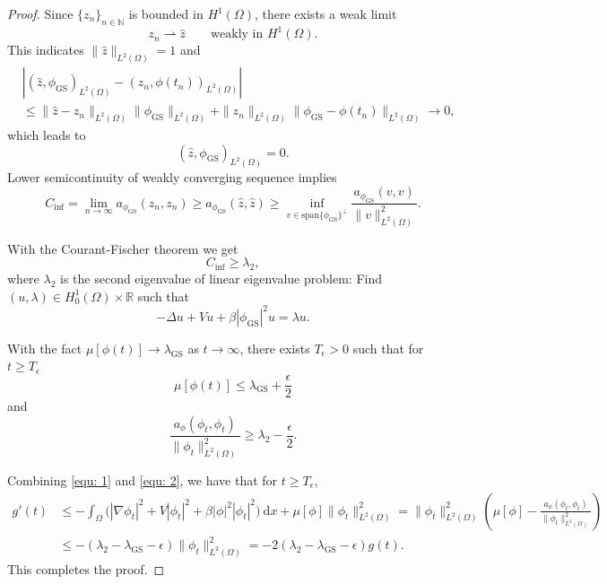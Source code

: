 \documentclass[10pt,a4paper]{amsart}
\def\R{\mathbb{R}}
\begin{document}
\begin{proof}
Since $\{z_n\}_{n \in \mathbb{N}}$ is bounded in $H^1(\Omega)$, there exists a weak limit 
\begin{equation*}
	z_n \rightharpoonup \hat{z} \qquad \text{weakly in $H^1(\Omega)$}.
\end{equation*}
This indicates $\|\hat{z}\|_{L^2(\Omega)} = 1$ and
\begin{align*}
	&\left| (\hat{z}, \phi_{\text{GS}})_{L^2(\Omega)} - (z_n, \phi(t_n))_{L^2(\Omega)}  \right| \\
	 &\le \|\hat{z} - z_n\|_{L^2(\Omega)}\|\phi_{\text{GS}}\|_{L^2(\Omega)} + \|z_n\|_{L^2(\Omega)}\|\phi_{\text{GS}} - \phi(t_n)\|_{L^2(\Omega)}  \to 0,
\end{align*} 
which leads to
\begin{equation*}
	(\hat{z}, \phi_{\text{GS}})_{L^2(\Omega)} = 0.
\end{equation*}
Lower semicontinuity of weakly converging sequence implies 
\begin{equation*}
	C_{\text{inf}} = \lim_{n \to \infty}a_{\phi_{\text{GS}}}(z_n,z_n) \ge a_{\phi_{\text{GS}}}(\hat{z}, \hat{z}) \ge \inf_{v \in \text{span}\{\phi_{\text{GS}}\}^\bot} \frac{a_{\phi_{\text{GS}}}(v, v)}{\|v\|_{L^2(\Omega)}^2}.
\end{equation*}

With the Courant-Fischer theorem we get
\begin{equation*}
	C_{\text{inf}} \ge \lambda_2,
\end{equation*}
where $\lambda_2$ is the second eigenvalue of linear eigenvalue problem: Find $(u,\lambda) \in H_0^1(\Omega) \times \R$ such that
\begin{equation*}
	- \Delta u + V u + \beta |\phi_{\text{GS}}|^2 u = \lambda u.
\end{equation*}
	
With the fact $\mu[\phi(t)] \to \lambda_{\text{GS}}$ as $t \to \infty$, there exists $T_{\epsilon} > 0$ such that for $t \ge T_{\epsilon}$
\begin{equation}\label{equ: 1}
	\mu[\phi(t)] \le \lambda_{\text{GS}} + \frac{\epsilon}{2}
\end{equation}
and 
\begin{equation}\label{equ: 2}
	\frac{a_{\phi}(\phi_t,\phi_t)}{\|\phi_t\|_{L^2(\Omega)}^2} \ge \lambda_2 - \frac{\epsilon}{2}.
\end{equation}

Combining \eqref{equ: 1} and \eqref{equ: 2}, we have that for $t \ge T_{\epsilon}$, 
\begin{align*}
	g'(t) & \le - \int_{\Omega} \Big( |\nabla \phi_t|^2 + V|\phi_t|^2 + \beta|\phi|^2 |\phi_t|^2 \Big) \ \text{d}x + \mu[\phi]\|\phi_t\|_{L^2(\Omega)}^2  = \|\phi_t\|_{L^2(\Omega)}^2 \left( \mu[\phi] - \frac{a_{\phi}(\phi_t,\phi_t)}{\|\phi_t\|_{L^2(\Omega)}^2} \right) \\
	& \le - (\lambda_2 - \lambda_{\text{GS}} - \epsilon) \|\phi_t\|_{L^2(\Omega)}^2 = -2(\lambda_2 - \lambda_{\text{GS}} - \epsilon)g(t).
\end{align*}
This completes the proof.
\end{proof}
\end{document}

